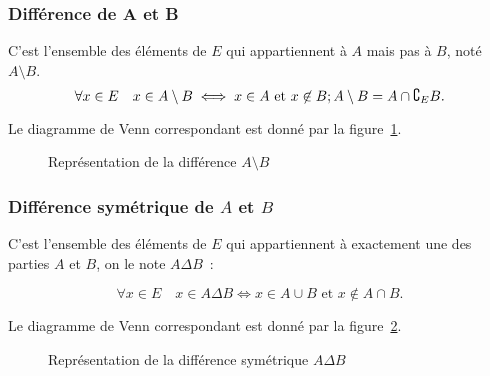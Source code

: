 \subsubsection{Différence de A et B}
\label{chap3-subsubsec:difference}

C'est l'ensemble des éléments de \(E\) qui appartiennent à \(A\) mais pas à 
\(B\), noté \(A \setminus B\).
\begin{equation}
    \forall x \in E \quad x \in A \setminus B \iff x \in A \text{~et~} x \not\in B; \\
    A \setminus B=A \cap \complement_E B.
\end{equation}

Le diagramme de Venn correspondant est donné par la figure~\ref{chap3-fig:diff}.

\begin{figure}
    \centering
    \caption{Représentation de la différence \(A \setminus B\)}
    \label{chap3-fig:diff}
\end{figure}

\subsubsection{Différence symétrique de \(A\) et \(B\)}
\label{chap3-subsubsec:differencesymetrique}

C'est l'ensemble des éléments de \(E\) qui appartiennent à exactement une des 
parties \(A\) et \(B\), on le note $A \Delta B$~:

\begin{equation}
    \forall x \in E \quad x \in A \Delta B \iff x \in A \cup B \text{~et~} x \not\in 
    A \cap B.
\end{equation}

Le diagramme de Venn correspondant est donné par la 
figure~\ref{chap3-fig:diffsym}.

\begin{figure}
    \centering
    \caption{Représentation de la différence symétrique \(A \Delta B\)}
    \label{chap3-fig:diffsym}
\end{figure}

